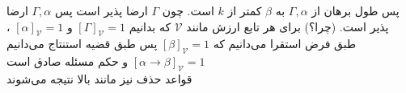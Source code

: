 \begin {ans}
\begin {enumerate}
		پس طول برهان از 
		$\Gamma , \alpha$
		به
		$\beta$ 
		کمتر از $k$ است.
		چون $\Gamma$ ارضا پذیر است پس 
		$\Gamma , \alpha$ 
		ارضا پذیر است. (چرا؟)
		 برای هر تابع ارزش مانند
		  $\mathcal {V}$ 
		  که بدانیم
		$[\Gamma]_\mathcal{V} = 1$ و $[\alpha]_\mathcal{V} = 1$ 
		، طبق فرض استقرا می‌دانیم که
		$[\beta]_\mathcal{V} = 1$
		پس طبق قضیه استنتاج می‌دانیم
		$[\alpha \to \beta]_\mathcal{V} = 1$
		و حکم مسئله صادق است \\
		قواعد حذف نیز مانند بالا نتیجه می‌شوند
		
		
		\end {enumerate}
				
	\end {ans}
	
